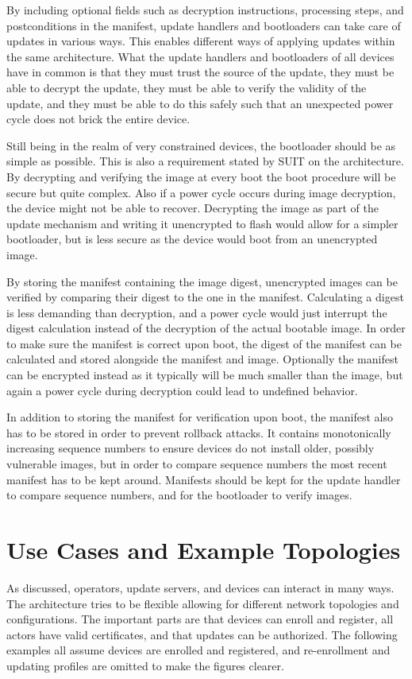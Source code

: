 \documentclass[0-thesis.tex]{subfiles}
\begin{document}
By including optional fields such as decryption instructions, processing steps, and
postconditions in the manifest, update handlers and bootloaders can take care of updates
in various ways. This enables different ways of applying updates within the same
architecture. What the update handlers and bootloaders of all devices have in common is
that they must trust the source of the update, they must be able to decrypt the update,
they must be able to verify the validity of the update, and they must be able to do this
safely such that an unexpected power cycle does not brick the entire device.

Still being in the realm of very constrained devices, the bootloader should be as simple
as possible. This is also a requirement stated by SUIT on the architecture. By decrypting
and verifying the image at every boot the boot procedure will be secure but quite complex.
Also if a power cycle occurs during image decryption, the device might not be able to
recover. Decrypting the image as part of the update mechanism and writing it unencrypted
to flash would allow for a simpler bootloader, but is less secure as the device would boot
from an unencrypted image.

By storing the manifest containing the image digest, unencrypted images can be verified by
comparing their digest to the one in the manifest. Calculating a digest is less demanding
than decryption, and a power cycle would just interrupt the digest calculation instead of
the decryption of the actual bootable image. In order to make sure the manifest is correct
upon boot, the digest of the manifest can be calculated and stored alongside the manifest
and image. Optionally the manifest can be encrypted instead as it typically will be much
smaller than the image, but again a power cycle during decryption could lead to undefined
behavior.

In addition to storing the manifest for verification upon boot, the manifest also has to
be stored in order to prevent rollback attacks. It contains monotonically increasing
sequence numbers to ensure devices do not install older, possibly vulnerable images, but
in order to compare sequence numbers the most recent manifest has to be kept around.
Manifests should be kept for the update handler to compare sequence numbers, and for the
bootloader to verify images.

\section{Use Cases and Example Topologies}
\label{sec:use-cases-examples-topologies}
As discussed, operators, update servers, and devices can interact in many ways. The
architecture tries to be flexible allowing for different network topologies and
configurations. The important parts are that devices can enroll and register, all actors
have valid certificates, and that updates can be authorized. The following examples all
assume devices are enrolled and registered, and re-enrollment and updating profiles are
omitted to make the figures clearer.
\end{document}
